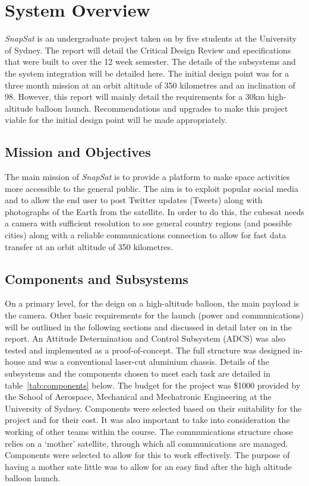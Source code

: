 \section{System Overview}
\textit{SnapSat} is an undergraduate project taken on by five students at the University of Sydney. The report will detail the Critical Design Review and specifications that were built to over the 12 week semester. The details of the subsystems and the system integration will be detailed here. The initial design point was for a three month mission at an orbit altitude of 350 kilometres and an inclination of 98\deg. However, this report will mainly detail the requirements for a 30km high-altitude balloon launch. Recommendations and upgrades to make this project viable for the initial design point will be made appropriately.


\subsection{Mission and Objectives}
The main mission of \textit{SnapSat} is to provide a platform to make space activities more accessible to the general public. The aim is to exploit popular social media and to allow the end user to post Twitter updates (Tweets) along with photographs of the Earth from the satellite. In order to do this, the cubesat needs a camera with sufficient resolution to see general country regions (and possible cities) along with a reliable communications connection to allow for fast data transfer at an orbit altitude of 350 kilometres. 
 
\subsection{Components and Subsystems}
On a primary level, for the deign on a high-altitude balloon, the main payload is the camera. Other basic requirements for the launch (power and communications) will be outlined in the following sections and discussed in detail later on in the report. An Attitude Determination and Control Subsystem (ADCS) was also tested and implemented as a proof-of-concept. The full structure was designed in-house and was a conventional laser-cut aluminium chassis. Details of the subsystems and the components chosen to meet each task are detailed in table~\ref{tab:components} below. The budget for the project was \$1000 provided by the School of Aerospace, Mechanical and Mechatronic Engineering at the University of Sydney. Components were selected based on their suitability for the project and for their cost. It was also important to take into consideration the working of other teams within the course. The communications structure chose relies on a `mother' satellite, through which all communications are managed. Components were selected to allow for this to work effectively. The purpose of having a mother sate little was to allow for an easy find after the high altitude balloon launch. 

